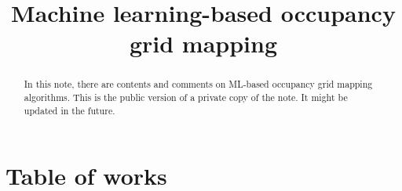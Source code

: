 \documentclass[onecolumn]{IEEEtran}
\begin{document}
	\title{Machine learning-based occupancy grid mapping}
	\author{
	}
	
	\maketitle
	\begin{abstract}
		In this note, there are contents and comments on ML-based occupancy grid mapping algorithms. 
		This is the public version of a private copy of the note. It might be updated in the future. 
	\end{abstract}
	\section{Table of works}
	\clearpage
\end{document}
